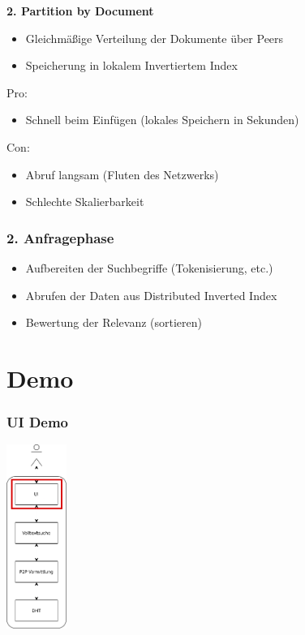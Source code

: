 \documentclass{beamer}
\begin{document}
\begin{frame}[allowframebreaks]
  \textbf{2. Partition by Document}

  \begin{itemize}
    \item Gleichmäßige Verteilung der Dokumente über Peers
    \item Speicherung in lokalem Invertiertem Index
  \end{itemize}

  \bigskip

  Pro:
  \begin{itemize}
    \item Schnell beim Einfügen (lokales Speichern in Sekunden)
  \end{itemize}
  Con:
  \begin{itemize}
    \item Abruf langsam (Fluten des Netzwerks)
    \item Schlechte Skalierbarkeit
  \end{itemize}
\end{frame}

\begin{frame}
  \frametitle{2. Anfragephase}

  \begin{itemize}
    \item Aufbereiten der Suchbegriffe (Tokenisierung, etc.)
    \item Abrufen der Daten aus Distributed Inverted Index
    \item Bewertung der Relevanz (sortieren)
  \end{itemize}
\end{frame}

\section{Demo}
\begin{frame}
  \frametitle{UI Demo}

  \begin{center}
    \includegraphics[height=6cm]{Schichten-alt-ui}
  \end{center}
\end{frame}
\end{document}
